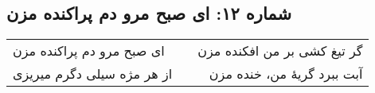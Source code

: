 \begin{center}
\section*{شماره ۱۲: ای صبح مرو دم پراکنده مزن}
\label{sec:012}
\begin{longtable}{l p{0.5cm} r}
ای صبح مرو دم پراکنده مزن
&&
گر تیغ کشی بر من افکنده مزن
\\
از هر مژه سیلی دگرم میریزی
&&
آبت ببرد گریهٔ من، خنده مزن
\\
\end{longtable}
\end{center}
